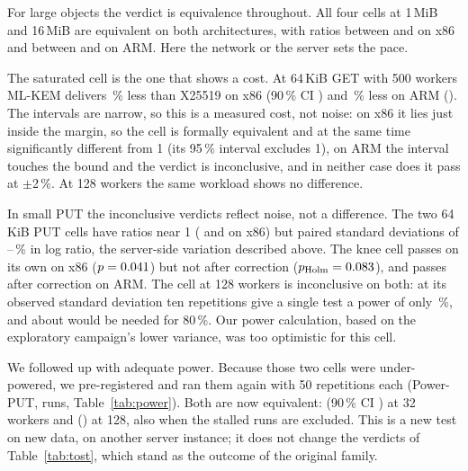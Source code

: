 \documentclass[review,12pt]{elsarticle}
\newcommand{\lab}[1]{\textsf{#1}}
\begin{document}
For large objects the verdict is equivalence throughout. All four cells at 1\,MiB and 16\,MiB are equivalent on both architectures,
with ratios between \RevLargeRatioLo{} and \RevLargeRatioHi{} on x86 and between
\ArmLargeRatioLo{} and \ArmLargeRatioHi{} on ARM. Here the network or the server sets the pace.

The saturated cell is the one that shows a cost. At 64\,KiB GET with 500 workers
ML-KEM delivers \RevHotDeficit\,\% less than X25519 on x86 (90\,\% CI \RevHotCI) and
\ArmHotDeficit\,\% less on ARM (\ArmHotCI). The intervals are narrow, so this is a measured
cost, not noise: on x86 it lies just inside the margin, so the cell is formally equivalent and at
the same time significantly different from 1 (its 95\,\% interval excludes 1), on ARM the
interval touches the bound and the verdict is inconclusive, and in neither case does it pass at
$\pm$2\,\%. At 128 workers the same workload shows no difference.

In small PUT the inconclusive verdicts reflect noise, not a difference. The two 64\,KiB PUT cells have ratios near 1
(\RevNoisyRatio{} and \RevKneeRatio{} on x86) but paired standard deviations of
\RevKneeSd--\ArmNoisySd\,\% in log ratio, the server-side variation described
above. The knee cell passes on its own on x86 ($p=0.041$) but not after
correction ($p_{\text{Holm}}=0.083$), and passes after correction on ARM. The cell at 128
workers is inconclusive on both: at its observed standard deviation ten repetitions give a single
test a power of only \RevPowerNoisy\,\%, and about \RevPowerNoisyNeeded{} would be needed for
80\,\%. Our power calculation, based on the exploratory campaign's lower variance, was too
optimistic for this cell.

We followed up with adequate power. Because those two cells were under-powered, we
pre-registered and ran them again with 50 repetitions each (\lab{Power-PUT}, \AudKRuns{} runs,
Table~\ref{tab:power}). Both are now equivalent: \AudKKneeRatio{} (90\,\% CI \AudKKneeCI) at 32
workers and \AudKSatRatio{} (\AudKSatCI) at 128, also when the \AudKStalls{} stalled runs are
excluded. This is a new test on new data, on another server instance; it does not change the
verdicts of Table~\ref{tab:tost}, which stand as the outcome of the original family.

\begin{table}[!htbp]
\caption{\lab{Power-PUT}: the two 64\,KiB PUT cells of the primary family repeated with 50 repetitions. Paired throughput ratio ML-KEM-768/X25519, TOST at $\pm$5\,\%, Holm-adjusted over the two cells; the last column gives the number of pairs and the verdict when stalled runs are excluded.}
\label{tab:power}
\centering\footnotesize
\setlength{\tabcolsep}{3pt}
\end{table}
\end{document}
